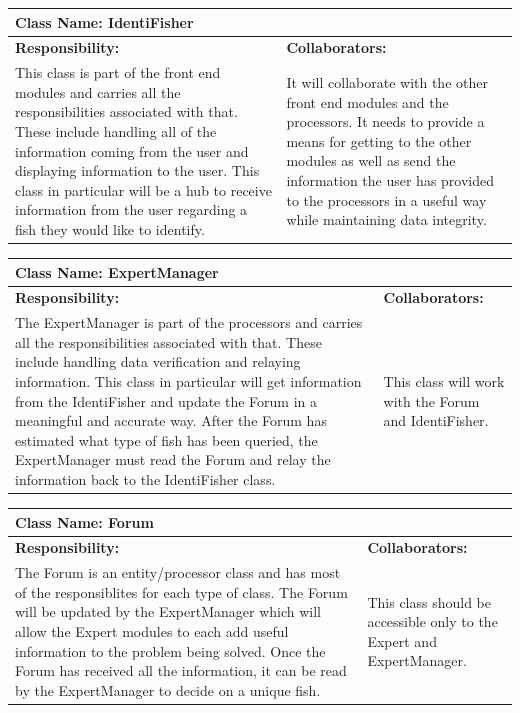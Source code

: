 \documentclass[]{article}
\begin{document}
	\begin{table}[ht]
		\centering
		\begin{tabular}{|p{5cm}|p{5cm}|}
		\hline
		 \multicolumn{2}{|l|}{\textbf{Class Name: IdentiFisher}} \\
		\hline
		\textbf{Responsibility:} & \textbf{Collaborators:} \\ \hline
		This class is part of the front end modules and carries all the responsibilities associated with that. These include handling all of the information coming from the user and displaying information to the user. This class in particular will be a hub to receive information from the user regarding a fish they would like to identify. & It will collaborate with the other front end modules and the processors. It needs to provide a means for getting to the other modules as well as send the information the user has provided to the processors in a useful way while maintaining data integrity. \\
		\hline
		\end{tabular}
	\end{table}

	\begin{table}[ht]
		\centering
		\begin{tabular}{|p{5cm}|p{5cm}|}
		\hline
		 \multicolumn{2}{|l|}{\textbf{Class Name: ExpertManager}} \\
		\hline
		\textbf{Responsibility:} & \textbf{Collaborators:} \\ \hline
		The ExpertManager is part of the processors and carries all the responsibilities associated with that. These include handling data verification and relaying information. This class in particular will get information from the IdentiFisher and update the Forum in a meaningful and accurate way. After the Forum has estimated what type of fish has been queried, the ExpertManager must read the Forum and relay the information back to the IdentiFisher class. & This class will work with the Forum and IdentiFisher.\\
		\hline
		\end{tabular}
	\end{table}

	\begin{table}[ht]
		\centering
		\begin{tabular}{|p{5cm}|p{5cm}|}
		\hline
		 \multicolumn{2}{|l|}{\textbf{Class Name: Forum}} \\
		\hline
		\textbf{Responsibility:} & \textbf{Collaborators:} \\ \hline
		The Forum is an entity/processor class and has most of the responsiblites for each type of class. The Forum will be updated by the ExpertManager which will allow the Expert modules to each add useful information to the problem being solved. Once the Forum has received all the information, it can be read by the ExpertManager to decide on a unique fish. & This class should be accessible only to the Expert and ExpertManager. \\
		\hline
		\end{tabular}
	\end{table}
\end{document}
